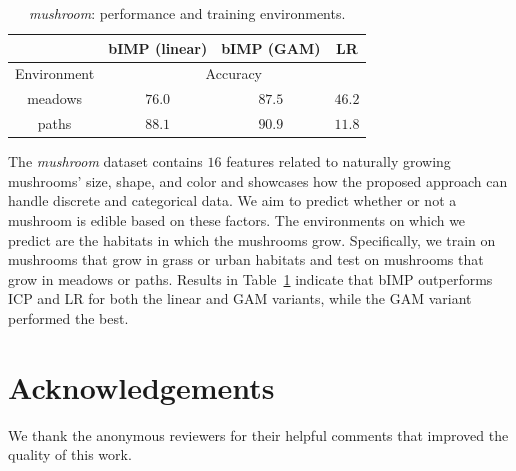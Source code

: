 \documentclass[conference,letterpaper]{IEEEtran}
\begin{document}
\vspace{-1em}
\begin{center} %
\begin{table}[h!]
\begin{center}
{\small
\begin{tabular}{ |c||c|c|c|  }
\hline 
  & \textsf{bIMP} (linear) & \textsf{bIMP} (GAM) & \textsf{LR} \\ %
 \hline
 \hline
 Environment & \multicolumn{3}{|c|}{Accuracy} \\
 \hline
 meadows & $76.0$  & $87.5$ & $46.2$ \\
 paths   & $88.1$  & $90.9$ & $11.8$ \\
 \hline
\end{tabular}
} %
\caption{\emph{mushroom}: performance and training environments.}\label{tbl::mush}
\vspace{-1em}
\end{center}
\end{table}
\end{center}

The \emph{mushroom} dataset contains $16$ features related to naturally growing mushrooms' size, shape, and color and showcases how the proposed approach can handle discrete and categorical data. We aim to predict whether or not a mushroom is edible based on these factors. The environments on which we predict are the habitats in which the mushrooms grow. Specifically, we train on mushrooms that grow in grass or urban habitats and test on mushrooms that grow in meadows or paths. Results in Table~\ref{tbl::mush} indicate that \textsf{bIMP} outperforms \textsf{ICP} and \textsf{LR} for both the linear and GAM variants, while the GAM variant performed the best. 

\section{Acknowledgements}
 We thank the anonymous reviewers for their helpful comments that improved the quality of this work.
\end{document}
